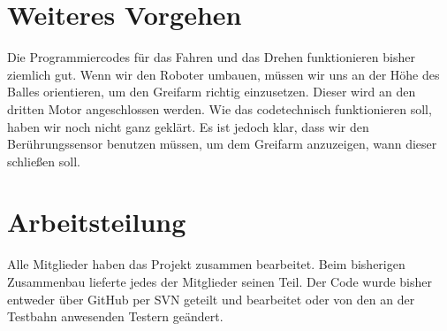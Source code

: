 \documentclass[11pt,a4paper]{article}
\begin{document}
\section{Weiteres Vorgehen}

Die Programmiercodes für das Fahren und das Drehen funktionieren bisher ziemlich gut. Wenn wir den Roboter umbauen, müssen wir uns 
an der Höhe des Balles orientieren, um den Greifarm richtig einzusetzen. Dieser wird an den dritten Motor angeschlossen werden. 
Wie das codetechnisch funktionieren soll, haben wir noch nicht ganz geklärt. Es ist jedoch klar, dass wir den Berührungssensor 
benutzen müssen, um dem Greifarm anzuzeigen, wann dieser schließen soll. 


\section{Arbeitsteilung}

Alle Mitglieder haben das Projekt zusammen bearbeitet. Beim bisherigen Zusammenbau lieferte jedes der Mitglieder seinen Teil. 
Der Code wurde bisher entweder über GitHub per SVN geteilt und bearbeitet oder von den an der Testbahn anwesenden Testern 
geändert.
\end{document}
